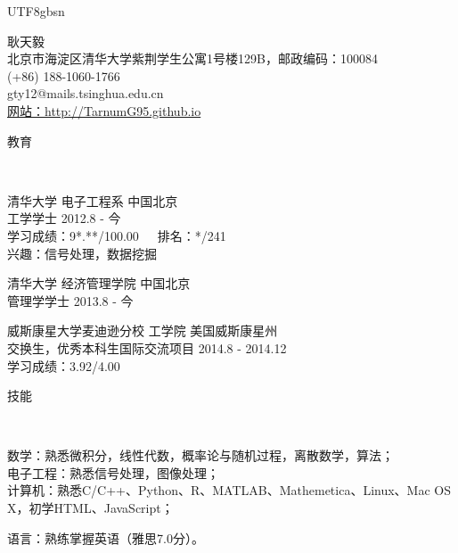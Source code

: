 \documentclass[9pt]{article}
\newenvironment{changemargin}[2]{%
  \begin{list}{}{%
    \setlength{\topsep}{0pt}%
    \setlength{\leftmargin}{#1}%
    \setlength{\rightmargin}{#2}%
    \setlength{\listparindent}{\parindent}%
    \setlength{\itemindent}{\parindent}%
    \setlength{\parsep}{\parskip}%
  }%
  \item[]}{\end{list}
}
\newcommand{\lineover}{
	\begin{changemargin}{-0.05in}{-0.05in}
		\vspace*{-8pt}
		\hrulefill \\
		\vspace*{-2pt}
	\end{changemargin}
}
\newcommand{\header}[1]{
	\begin{changemargin}{-0.5in}{-0.5in}
		\scshape{#1}\\
  	\lineover
	\end{changemargin}
}
\newcommand{\contact}[5]{
	\begin{changemargin}{-0.5in}{-0.5in}
		\begin{center}
			{\Large \scshape {#1}}\\ \smallskip
			{#2}\\ \smallskip 
			{#3}\\ \smallskip
			{#4}\\ \smallskip
			{#5}\smallskip
		\end{center}
	\end{changemargin}
}
\newenvironment{body} {
	\vspace*{-16pt}
	\begin{changemargin}{-0.25in}{-0.5in}
  }	
	{\end{changemargin}
}
\begin{document}
\begin{CJK*}{UTF8}{gbsn}

\contact{耿天毅}{北京市海淀区清华大学紫荆学生公寓1号楼129B，邮政编码：100084}{(+86) 188-1060-1766}{gty12@mails.tsinghua.edu.cn}{\href{http://TarnumG95.github.io}{网站：http://TarnumG95.github.io}}

\header{教育}

\begin{body}
	\vspace{14pt}

	清华大学 电子工程系 \hfill 中国北京 \\
工学学士 \hfill 2012.8 - 今 \\
学习成绩：9*.**/100.00\ \ \ 排名：*/241\\
兴趣：信号处理，数据挖掘 \\
\vspace{6pt}

	清华大学 经济管理学院 \hfill 中国北京 \\
管理学学士 \hfill 2013.8 - 今 \\
\vspace{6pt}

	威斯康星大学麦迪逊分校 工学院 \hfill 美国威斯康星州 \\
交换生，优秀本科生国际交流项目 \hfill 2014.8 - 2014.12 \\
学习成绩：3.92/4.00

\end{body}

\smallskip
\smallskip
\smallskip

\header{技能}

\begin{body}
	\vspace{14pt}
	数学：熟悉微积分，线性代数，概率论与随机过程，离散数学，算法；\\
	\smallskip
	电子工程：熟悉信号处理，图像处理；\\
	\smallskip
	计算机：熟悉C/C++、Python、R、MATLAB、Mathemetica、Linux、Mac OS X，初学HTML、JavaScript；\\
	\smallskip

	语言：熟练掌握英语（雅思7.0分）。\\
\end{body}
\smallskip
\smallskip
\smallskip


\end{CJK*}
\end{document}

